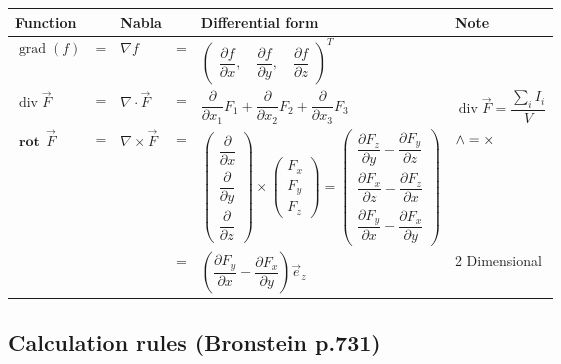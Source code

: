 \renewcommand{\arraystretch}{2}		
		\begin{tabularx}{\linewidth}{lllllX}
			\hline
			Function & &Nabla & &Differential form & Note \\
			\hline
			$\operatorname{grad}(f)$ &=& 
			$\nabla f$ &=&
			 $ 
			\begin{pmatrix} \dfrac{\partial f}{\partial x}, \quad\dfrac{\partial f}{\partial
				y}, \quad \dfrac{\partial f}{\partial z} \end{pmatrix}^T$&\\	
			\hline 
			$\operatorname{div}\vec F$ &=& 
			$\nabla \cdot \vec F$&=&
			$\dfrac{\partial}{\partial x_1}F_1 + \dfrac{\partial}{\partial x_2}F_2+ \dfrac{\partial}{\partial x_3}F_3$&
			$\operatorname{div}\vec F = \dfrac{\sum_i I_i}{V}$\\
			\hline
			$\mathbf{\operatorname{rot}}\,\vec F$ &=& 
			$\nabla\times \vec F$ &=& 
			$\begin{pmatrix} \dfrac{\partial}{\partial x} \\ \dfrac{\partial}{\partial y} \\
				\dfrac{\partial}{\partial z} \end{pmatrix} \times \begin{pmatrix} F_x\\ F_y\\ F_z
			\end{pmatrix} = \begin{pmatrix} \dfrac{\partial F_z}{\partial y} - \dfrac{\partial
				F_y}{\partial z} \\ \dfrac{\partial F_x}{\partial z} - \dfrac{\partial
				F_z}{\partial x} \\ \dfrac{\partial F_y}{\partial x} - \dfrac{\partial
				F_x}{\partial y} \end{pmatrix}$&
			$\mathbf{\wedge = \times} \newline$\\ 
			&&
			&=&
			$ \left (\dfrac{\partial F_y}{\partial x} - \dfrac{\partial F_x}{\partial y}\right )\vec e_z$ & 2 Dimensional\\
			\hline
		\end{tabularx}

\renewcommand{\arraystretch}{1}				


	
	\subsection{Calculation rules (Bronstein p.731)}
	
